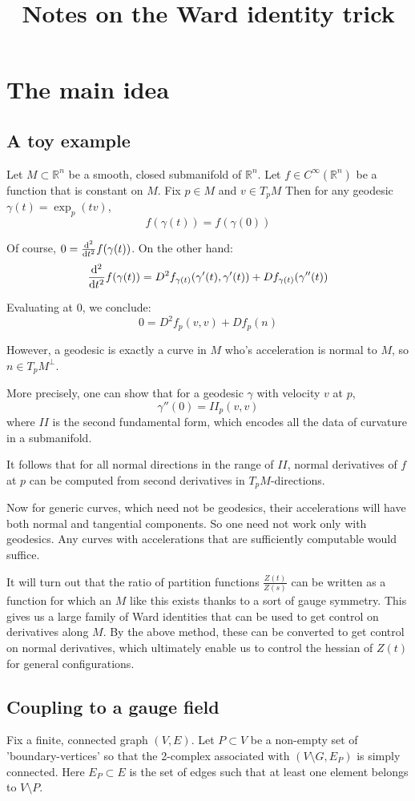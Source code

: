 \documentclass[11pt]{amsart}
\title{Notes on the Ward identity trick}
\date{} %
\numberwithin{theorem}{subsection}
\numberwithin{lemma}{subsection}
\numberwithin{corollary}{subsection}
\numberwithin{definition}{subsection}
\numberwithin{prop}{subsection}
\newcommand{\bR}{\mathbb{R}}
\begin{document}
\maketitle 
\tableofcontents
\section{The main idea}
\subsection{A toy example}
Let $M\subset\bR^n$ be a smooth, closed submanifold of $\bR^n$.
Let $f\in C^\infty(\bR^n)$ be a function that is constant on $M$.
Fix $p\in M$ and $v\in T_p M$
Then for any geodesic $\gamma(t)=\exp_p(tv)$,
\[f(\gamma(t)) = f(\gamma(0))\]

Of course, $0=\dv[2]{t}f(\gamma(t))$.
On the other hand:
\[\dv[2]{t}f(\gamma(t)) =  D^2 f_{\gamma(t)}(\gamma'(t),\gamma'(t)) + Df_{\gamma(t)}(\gamma''(t))\]

Evaluating at $0$, we conclude:
\[0= D^2 f_p(v,v) + Df_p(n)\]

However, a geodesic is exactly a curve in $M$ who's acceleration is normal to $M$, so $n\in T_p M^\perp$.

More precisely, one can show that for a geodesic $\gamma$ with velocity $v$ at $p$,
\[\gamma''(0)=II_p(v,v)\]
where $II$ is the second fundamental form, which encodes all the data of curvature in a submanifold.

It follows that for all normal directions in the range of $II$, normal derivatives of $f$ at $p$ can 
be computed from second derivatives in $T_pM$-directions.

Now for generic curves, which need not be geodesics, their accelerations will have both normal and tangential components. So one need not work only with geodesics. Any curves with accelerations that are sufficiently computable would suffice.


It will turn out that the ratio of partition functions $\frac{Z(t)}{Z(s)}$
can be written as a function for which an $M$ like this exists thanks to a sort of gauge symmetry. This gives us a large family of Ward identities that can be used to get control on derivatives along $M$.
By the above method, these can be converted to get control on normal derivatives, which ultimately enable us to control the hessian of $Z(t)$ for general configurations.
\subsection{Coupling to a gauge field}
Fix a finite, connected graph $(V,E)$. Let $P\subset V$ be a non-empty set of 'boundary-vertices' so that the 2-complex associated with $(V\setminus G, E_P)$ is simply connected. 
Here $E_P\subset E$ is the set of edges such that at least one element belongs to $V\setminus P$.
\end{document}
